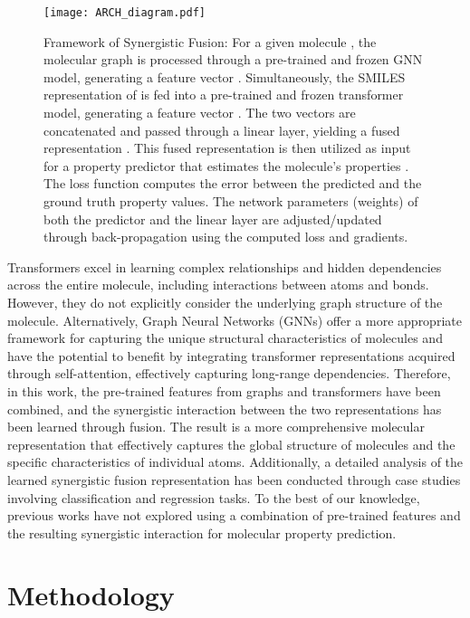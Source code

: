 \documentclass[sigconf,nonacm]{acmart}
\begin{document}
\begin{figure*}
    \centering
    \texttt{[image: ARCH\_diagram.pdf]}
    \caption{Framework of Synergistic Fusion: For a given molecule , the molecular graph is processed through a pre-trained and frozen GNN model, generating a  feature vector . Simultaneously, the SMILES representation of  is fed into a pre-trained and frozen transformer model, generating a feature vector  . The two vectors are concatenated and passed through a linear layer, yielding a fused representation . This fused representation  is then utilized as input for a property predictor that estimates the molecule's properties . The loss function computes the error between the predicted and the ground truth property values. The network parameters (weights) of both the predictor and the linear layer are adjusted/updated through back-propagation using the computed loss and gradients.}
    \label{fig:img1}
\end{figure*}



Transformers excel in learning complex relationships and hidden dependencies across the entire molecule, including interactions between atoms and bonds. However, they do not explicitly consider the underlying graph structure of the molecule. Alternatively, Graph Neural Networks (GNNs) offer a more appropriate framework for capturing the unique structural characteristics of molecules and have the potential to benefit by integrating transformer representations acquired through self-attention, effectively capturing long-range dependencies. Therefore, in this work, the pre-trained features from graphs and transformers have been combined, and the synergistic interaction between the two representations has been learned through fusion. The result is a more comprehensive molecular representation that effectively captures the global structure of molecules and the specific characteristics of individual atoms. Additionally, a detailed analysis of the learned synergistic fusion representation has been conducted through case studies involving classification and regression tasks. To the best of our knowledge, previous works have not explored using a combination of pre-trained features and the resulting synergistic interaction for molecular property prediction.




\section{Methodology}
\end{document}
